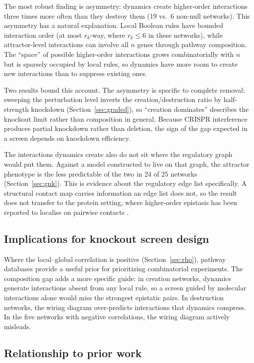 \documentclass[10pt]{article}
\begin{document}
The most robust finding is asymmetry: dynamics create higher-order
interactions three times more often than they destroy them (19 vs.\ 6
non-null networks). This asymmetry has a natural explanation. Local
Boolean rules have bounded interaction order (at most $r_k$-way,
where $r_k \leq 6$ in these networks), while attractor-level
interactions can involve all $n$ genes through pathway composition.
The ``space'' of possible higher-order interactions grows
combinatorially with $n$ but is sparsely occupied by local rules,
so dynamics have more room to create new interactions than to
suppress existing ones.

Two results bound this account. The asymmetry is specific to complete
removal: sweeping the perturbation level inverts the creation/destruction
ratio by half-strength knockdown (Section~\ref{sec:graded}), so
``creation dominates'' describes the knockout limit rather than
composition in general. Because CRISPR interference produces partial
knockdown rather than deletion, the sign of the gap expected in a screen
depends on knockdown efficiency.

The interactions dynamics create also do not sit where the regulatory
graph would put them. Against a model constructed to live on that graph,
the attractor phenotype is the less predictable of the two in 24 of 25
networks (Section~\ref{sec:gnk}). This is evidence about the regulatory
edge list specifically. A structural contact map carries information an
edge list does not, so the result does not transfer to the protein
setting, where higher-order epistasis has been reported to localise on
pairwise contacts \citep{brookes2022sparsity}.

\subsection{Implications for knockout screen design}

Where the local--global correlation is positive
(Section~\ref{sec:rho}), pathway databases provide a useful prior
for prioritizing combinatorial experiments. The composition gap
adds a more specific guide: in creation networks, dynamics generate
interactions absent from any local rule, so a screen guided by
molecular interactions alone would miss the strongest epistatic
pairs. In destruction networks, the wiring diagram over-predicts
interactions that dynamics compress. In the five networks with
negative correlations, the wiring diagram actively misleads.

\subsection{Relationship to prior work}
\end{document}
